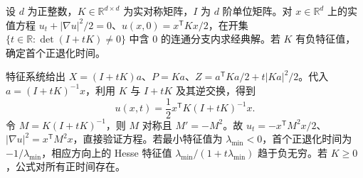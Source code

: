 \begin{optionalexercise}\label{b2:ex:07-quadratic-hamilton}
设 \(d\) 为正整数，\(K\in\mathbb R^{d\times d}\) 为实对称矩阵，\(I\) 为 \(d\) 阶单位矩阵。对 \(x\in\mathbb R^d\) 上的实值方程 \(u_t+|\nabla u|^2/2=0\)、\(u(x,0)=x^{\mathsf T}Kx/2\)，在开集 \(\{t\in\mathbb R:\det(I+tK)\ne0\}\) 中含 \(0\) 的连通分支内求经典解。若 \(K\) 有负特征值，确定首个正退化时间。
\end{optionalexercise}
\begin{solution}
特征系统给出 \(X=(I+tK)a\)、\(P=Ka\)、\(Z=a^{\mathsf T}Ka/2+t|Ka|^2/2\)。代入 \(a=(I+tK)^{-1}x\)，利用 \(K\) 与 \(I+tK\) 及其逆交换，得到
\[
 u(x,t)=\frac12x^{\mathsf T}K(I+tK)^{-1}x.
\]
令 \(M=K(I+tK)^{-1}\)，则 \(M\) 对称且 \(M'=-M^2\)。故 \(u_t=-x^{\mathsf T}M^2x/2\)、\(|\nabla u|^2=x^{\mathsf T}M^2x\)，直接验证方程。若最小特征值为 \(\lambda_{\min}<0\)，首个正退化时间为 \(-1/\lambda_{\min}\)，相应方向上的 Hesse 特征值 \(\lambda_{\min}/(1+t\lambda_{\min})\) 趋于负无穷。若 \(K\geq0\)，公式对所有正时间存在。
\end{solution}
